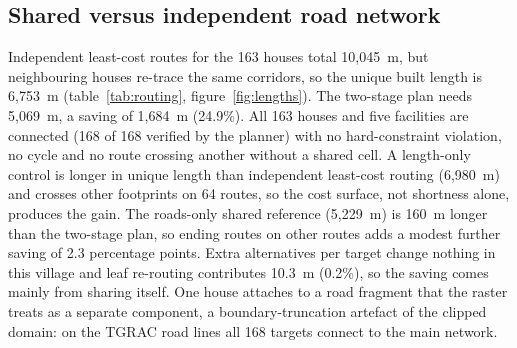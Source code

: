 \subsection{Shared versus independent road network}
Independent least-cost routes for the 163 houses total 10{,}045~m, but neighbouring houses re-trace the same corridors, so the unique built length is 6{,}753~m (table~\ref{tab:routing}, figure~\ref{fig:lengths}). The two-stage plan needs 5{,}069~m, a saving of 1{,}684~m (24.9\%). All 163 houses and five facilities are connected (168 of 168 verified by the planner) with no hard-constraint violation, no cycle and no route crossing another without a shared cell. A length-only control is longer in unique length than independent least-cost routing (6{,}980~m) and crosses other footprints on 64 routes, so the cost surface, not shortness alone, produces the gain. The roads-only shared reference (5{,}229~m) is 160~m longer than the two-stage plan, so ending routes on other routes adds a modest further saving of 2.3 percentage points. Extra alternatives per target change nothing in this village and leaf re-routing contributes 10.3~m (0.2\%), so the saving comes mainly from sharing itself. One house attaches to a road fragment that the raster treats as a separate component, a boundary-truncation artefact of the clipped domain: on the TGRAC road lines all 168 targets connect to the main network.

